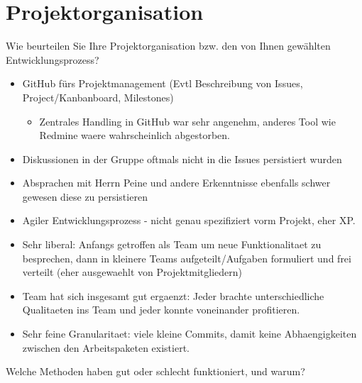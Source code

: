 \documentclass[12pt,DIV14,BCOR10mm,a4paper,parskip=half-,headsepline,headinclude,english,ngerman,bibliography=totocnumbered]{scrreprt}
\begin{document}
\vspace*{-3cm}

\tableofcontents  %

\chapter{Projektorganisation}

Wie beurteilen Sie Ihre Projektorganisation bzw. den von Ihnen gewählten Entwicklungsprozess?

\begin{itemize}
  \item GitHub fürs Projektmanagement (Evtl Beschreibung von Issues, Project/Kanbanboard, Milestones)
  \begin{itemize}
    \item Zentrales Handling in GitHub war sehr angenehm, anderes Tool wie Redmine waere wahrscheinlich abgestorben.
  \end{itemize}
  \item Diskussionen in der Gruppe oftmals nicht in die Issues persistiert wurden
  \item Absprachen mit Herrn Peine und andere Erkenntnisse ebenfalls schwer gewesen diese zu persistieren
  \item Agiler Entwicklungsprozess - nicht genau spezifiziert vorm Projekt, eher XP.
  \item Sehr liberal: Anfangs getroffen als Team um neue Funktionalitaet zu besprechen, dann in kleinere Teams aufgeteilt/Aufgaben formuliert und frei verteilt (eher ausgewaehlt von Projektmitgliedern)
  \item Team hat sich insgesamt gut ergaenzt: Jeder brachte unterschiedliche Qualitaeten ins Team und jeder konnte voneinander profitieren.
  \item Sehr feine Granularitaet: viele kleine Commits, damit keine Abhaengigkeiten zwischen den Arbeitspaketen existiert.
\end{itemize}

Welche Methoden haben gut oder schlecht funktioniert, und warum?
\end{document}
